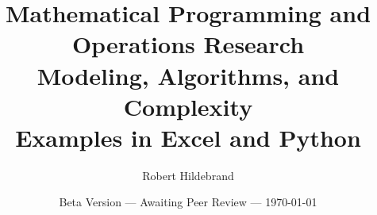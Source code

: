  \title{ \textbf{Mathematical Programming and\\ Operations Research}\\ Modeling, Algorithms, and Complexity\\
 Examples in Excel and Python}
  \author{Robert Hildebrand}
  \date{Beta Version --- Awaiting Peer Review --- \today}

